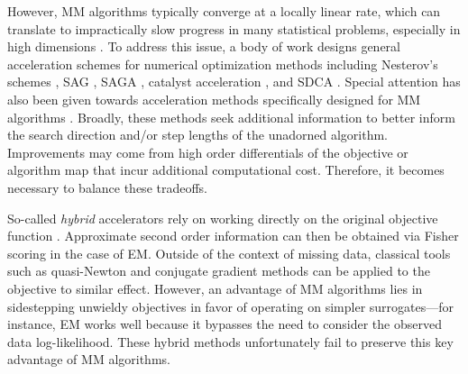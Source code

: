 \documentclass{statsoc}
\begin{document}
However, MM algorithms typically converge at a locally linear rate, which can translate to impractically slow progress in many statistical problems, especially in high dimensions \citep{wu1983convergence,boyles1983convergence,meng1994global}. To address this issue,  a body of work designs general acceleration schemes for numerical optimization methods including Nesterov's schemes \citep{nesterov1983method}, SAG \citep{schmidt2017minimizing}, SAGA \citep{defazio2014saga}, catalyst acceleration \citep{lin2017generic}, and  SDCA \citep{shalev2014accelerated}. Special attention has also been given towards acceleration methods specifically designed for MM algorithms \citep{jamshidian1997acceleration, jamshidian1993conjugate, lange1995quasi, zhou2011quasi}. Broadly, these methods  seek additional information to better inform the search direction and/or step lengths of the unadorned algorithm. Improvements may come from high order differentials of the objective or  algorithm map that incur additional computational cost. Therefore, it becomes necessary to balance these tradeoffs.

So-called \textit{hybrid} accelerators  \citep{jamshidian1997acceleration} rely on working directly on the original objective function  \citep{lange1995quasi, jamshidian1997acceleration, jamshidian1993conjugate}. Approximate second order information can then be obtained via Fisher scoring in the case of EM. Outside of the context of missing data, classical tools such as quasi-Newton and conjugate gradient methods can be applied to the objective to similar effect. However, an advantage of MM algorithms lies in sidestepping unwieldy objectives in favor of operating on simpler surrogates---for instance, EM works well because it bypasses the need to consider the observed data log-likelihood. These hybrid methods unfortunately fail to preserve this key advantage of MM algorithms. %
\end{document}
